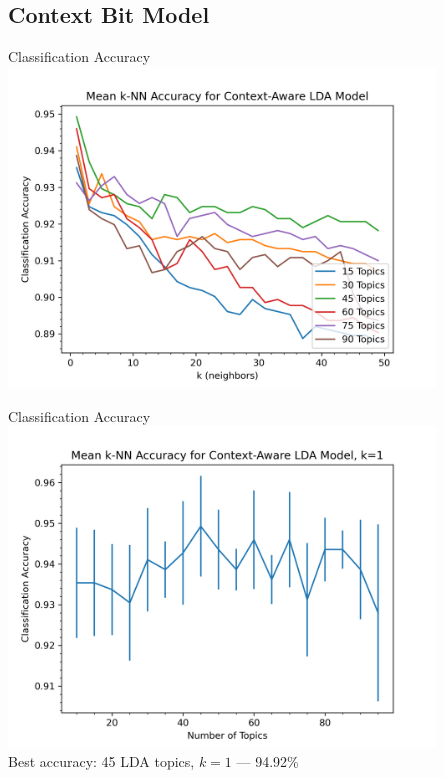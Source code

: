 \documentclass[handout,11pt]{beamer}
\begin{document}
	\subsection{Context Bit Model}
	\begin{frame}{Classification Accuracy}
		\centering
		\includegraphics[width=0.85\textwidth]{img/win32/knn_lda_context.png}
	\end{frame}
	\begin{frame}{Classification Accuracy}
		\centering
		\includegraphics[width=0.85\textwidth]{img/win32/knn_lda_context_k_01.png} \\
		Best accuracy: 45 LDA topics, $k=1$ --- 94.92\%
	\end{frame}
\end{document}
